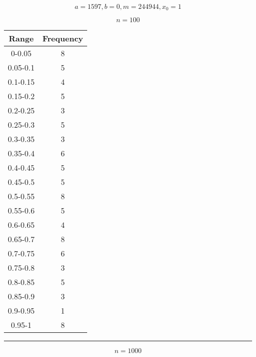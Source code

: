 \documentclass{article}
\begin{document}
$$a= 1597,  b= 0,  m= 244944,  x_0= 1$$


$$n= 100$$

\begin{center} \begin{tabular}{||c | c||}  \hline
		Range & Frequency \\ [0.5ex] \hline \hline0-0.05 & 8\\
		\hline 
		0.05-0.1 & 5\\
		\hline 
		0.1-0.15 & 4\\
		\hline 
		0.15-0.2 & 5\\
		\hline 
		0.2-0.25 & 3\\
		\hline 
		0.25-0.3 & 5\\
		\hline 
		0.3-0.35 & 3\\
		\hline 
		0.35-0.4 & 6\\
		\hline 
		0.4-0.45 & 5\\
		\hline 
		0.45-0.5 & 5\\
		\hline 
		0.5-0.55 & 8\\
		\hline 
		0.55-0.6 & 5\\
		\hline 
		0.6-0.65 & 4\\
		\hline 
		0.65-0.7 & 8\\
		\hline 
		0.7-0.75 & 6\\
		\hline 
		0.75-0.8 & 3\\
		\hline 
		0.8-0.85 & 5\\
		\hline 
		0.85-0.9 & 3\\
		\hline 
		0.9-0.95 & 1\\
		\hline 
		0.95-1 & 8\\
		\hline 
	\end{tabular} 
\end{center}

\pagebreak

\begin {figure}
\begin{center}
	
\end{center}
\end {figure}
\noindent\rule[0.5ex]{\linewidth}{1pt}



$$n= 1000$$
\end{document}
